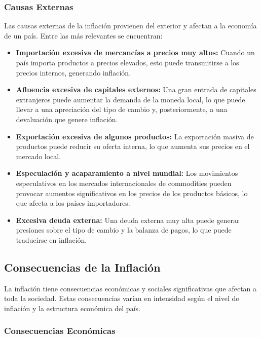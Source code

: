 \documentclass[
  stu,
  floatsintext,
  longtable,
  a4paper,
  nolmodern,
  notxfonts,
  notimes,
  12pt,
  colorlinks=true,linkcolor=blue,citecolor=blue,urlcolor=blue]{apa7}
\providecommand{\tightlist}{%
  \setlength{\itemsep}{0pt}\setlength{\parskip}{0pt}}
\begin{document}
\subsubsection{Causas Externas}\label{causas-externas}

Las causas externas de la inflación provienen del exterior y afectan a
la economía de un país. Entre las más relevantes se encuentran:

\begin{itemize}
\tightlist
\item
  \textbf{Importación excesiva de mercancías a precios muy altos:}
  Cuando un país importa productos a precios elevados, esto puede
  transmitirse a los precios internos, generando inflación.
\item
  \textbf{Afluencia excesiva de capitales externos:} Una gran entrada de
  capitales extranjeros puede aumentar la demanda de la moneda local, lo
  que puede llevar a una apreciación del tipo de cambio y,
  posteriormente, a una devaluación que genere inflación.
\item
  \textbf{Exportación excesiva de algunos productos:} La exportación
  masiva de productos puede reducir su oferta interna, lo que aumenta
  sus precios en el mercado local.
\item
  \textbf{Especulación y acaparamiento a nivel mundial:} Los movimientos
  especulativos en los mercados internacionales de commodities pueden
  provocar aumentos significativos en los precios de los productos
  básicos, lo que afecta a los países importadores.
\item
  \textbf{Excesiva deuda externa:} Una deuda externa muy alta puede
  generar presiones sobre el tipo de cambio y la balanza de pagos, lo
  que puede traducirse en inflación.
\end{itemize}

\subsection{Consecuencias de la
Inflación}\label{consecuencias-de-la-inflaciuxf3n}

La inflación tiene consecuencias económicas y sociales significativas
que afectan a toda la sociedad. Estas consecuencias varían en intensidad
según el nivel de inflación y la estructura económica del país.

\subsubsection{Consecuencias
Económicas}\label{consecuencias-econuxf3micas}
\end{document}
